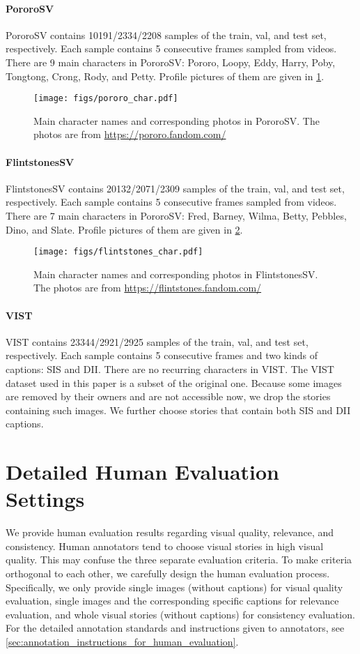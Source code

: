 \documentclass[10pt,twocolumn,letterpaper]{article}
\begin{document}
\paragraph{PororoSV}
PororoSV contains 10191/2334/2208 samples of the train, val, and test set, respectively. Each sample contains 5 consecutive frames sampled from videos. There are 9 main characters in PororoSV: Pororo, Loopy, Eddy, Harry, Poby, Tongtong, Crong, Rody, and Petty. Profile pictures of them are given in \cref{fig:pororosv_char}.
\begin{figure}[h]
    \centering
    \texttt{[image: figs/pororo\_char.pdf]}
    \caption{Main character names and corresponding photos in PororoSV. The photos are from \url{https://pororo.fandom.com/}}
    \label{fig:pororosv_char}
\end{figure}
\paragraph{FlintstonesSV}
FlintstonesSV contains 20132/2071/2309 samples of the train, val, and test set, respectively. Each sample contains 5 consecutive frames sampled from videos. There are 7 main characters in PororoSV: Fred, Barney, Wilma, Betty, Pebbles, Dino, and Slate. Profile pictures of them are given in \cref{fig:flintstonesv_char}.
\begin{figure}[h]
    \centering
    \texttt{[image: figs/flintstones\_char.pdf]}
    \caption{Main character names and corresponding photos in FlintstonesSV. The photos are from \url{https://flintstones.fandom.com/}}
    \label{fig:flintstonesv_char}
\end{figure}
\newpage
\paragraph{VIST}
VIST contains 23344/2921/2925 samples of the train, val, and test set, respectively. Each sample contains 5 consecutive frames and two kinds of captions: SIS and DII. There are no recurring characters in VIST. The VIST dataset used in this paper is a subset of the original one. Because some images are removed by their owners and are not accessible now, we drop the stories containing such images. We further choose stories that contain both SIS and DII captions.

\section{Detailed Human Evaluation Settings}
\label{sec:detailed_human_evaluation_settings}
We provide human evaluation results regarding visual quality, relevance, and consistency. Human annotators tend to choose visual stories in high visual quality. This may confuse the three separate evaluation criteria. To make criteria orthogonal to each other, we carefully design the human evaluation process. Specifically, we only provide single images (without captions) for visual quality evaluation, single images and the corresponding specific captions for relevance evaluation, and whole visual stories (without captions) for consistency evaluation. For the detailed annotation standards and instructions given to annotators, see \cref{sec:annotation_instructions_for_human_evaluation}.
\end{document}
